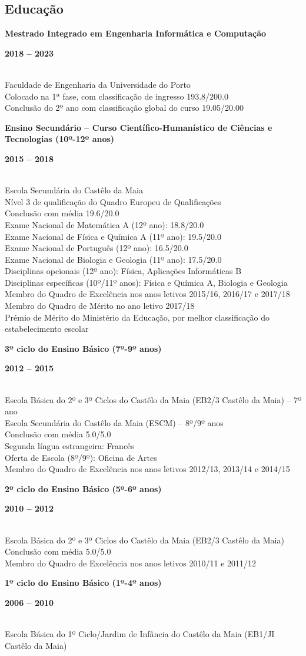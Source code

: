 \documentclass[8pt]{extarticle}
\newcommand{\parag}[1]{
\begin{minipage}{\textwidth} \hfill
\begin{minipage}{\dimexpr\textwidth-0.6cm}
	#1
\end{minipage}
\end{minipage}
}
\newcommand{\itemtime}[2]{
#1 \hfill \begin{minipage}[t]{0.185\textwidth}         #2  \end{minipage}
}
\newcommand{\job}[3]{\parag{
\itemtime{\textbf{#1}}{\textbf{#2}}\\
#3 \vspace*{9px}}}
\begin{document}
\subsection*{Educação}
\job{Mestrado Integrado em Engenharia Informática e Computação}{2018 – 2023}{
Faculdade de Engenharia da Universidade do Porto\\
Colocado na 1ª fase, com classificação de ingresso 193.8/200.0\\
Conclusão do 2º ano com classificação global do curso 19.05/20.00
}
\job{Ensino Secundário – Curso Científico-Humanístico de Ciências e Tecnologias (10º-12º anos)}{2015 – 2018}{
Escola Secundária do Castêlo da Maia\\
Nível 3 de qualificação do Quadro Europeu de Qualificações\\
Conclusão com média 19.6/20.0\\
Exame Nacional de Matemática A (12º ano): 18.8/20.0\\
Exame Nacional de Física e Química A (11º ano): 19.5/20.0\\
Exame Nacional de Português (12º ano): 16.5/20.0\\
Exame Nacional de Biologia e Geologia (11º ano): 17.5/20.0\\
Disciplinas opcionais (12º ano): Física, Aplicações Informáticas B\\
Disciplinas específicas (10º/11º anos): Física e Química A, Biologia e Geologia\\
Membro do Quadro de Excelência nos anos letivos 2015/16, 2016/17 e 2017/18\\
Membro do Quadro de Mérito no ano letivo 2017/18\\
Prémio de Mérito do Ministério da Educação, por melhor classificação do estabelecimento escolar
}
\job{3º ciclo do Ensino Básico (7º-9º anos)}{2012 – 2015}{
Escola Básica do 2º e 3º Ciclos do Castêlo da Maia (EB2/3 Castêlo da Maia) – 7º ano\\
Escola Secundária do Castêlo da Maia (ESCM) – 8º/9º anos\\
Conclusão com média 5.0/5.0\\
Segunda língua estrangeira: Francês\\
Oferta de Escola (8º/9º): Oficina de Artes\\
Membro do Quadro de Excelência nos anos letivos 2012/13, 2013/14 e 2014/15
}
\job{2º ciclo do Ensino Básico (5º-6º anos)}{2010 – 2012}{
Escola Básica do 2º e 3º Ciclos do Castêlo da Maia (EB2/3 Castêlo da Maia)\\
Conclusão com média 5.0/5.0\\
Membro do Quadro de Excelência nos anos letivos 2010/11 e 2011/12
}
\job{1º ciclo do Ensino Básico (1º-4º anos)}{2006 – 2010}{
Escola Básica do 1º Ciclo/Jardim de Infância do Castêlo da Maia (EB1/JI Castêlo da Maia)
}
\end{document}
